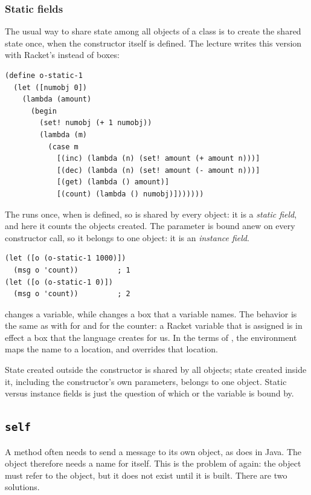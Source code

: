 \subsubsection{Static fields} The usual way to share state among all objects of a class is to create the shared state once, when the constructor itself is defined. The lecture writes this version with Racket's  instead of boxes:
\begin{lstlisting}
(define o-static-1
  (let ([numobj 0])
    (lambda (amount)
      (begin
        (set! numobj (+ 1 numobj))
        (lambda (m)
          (case m
            [(inc) (lambda (n) (set! amount (+ amount n)))]
            [(dec) (lambda (n) (set! amount (- amount n)))]
            [(get) (lambda () amount)]
            [(count) (lambda () numobj)]))))))
\end{lstlisting}
The  runs once, when  is defined, so  is shared by every object: it is a \emph{static field}, and here it counts the objects created. The parameter  is bound anew on every constructor call, so it belongs to one object: it is an \emph{instance field}.
\begin{lstlisting}[style=repl]
(let ([o (o-static-1 1000)])
  (msg o 'count))         ; 1
(let ([o (o-static-1 0)])
  (msg o 'count))         ; 2
\end{lstlisting}
 changes a variable, while  changes a box that a variable names. The behavior is the same as with  for  and  for the counter: a Racket variable that is assigned is in effect a box that the language creates for us. In the terms of , the environment maps the name to a location, and  overrides that location.

\begin{keypoint}[Lifetime of a binding = how widely it is shared]
State created outside the constructor is shared by all objects; state created inside it, including the constructor's own parameters, belongs to one object. Static versus instance fields is just the question of which  or  the variable is bound by.
\end{keypoint}

\subsection{\texttt{self}}

A method often needs to send a message to its own object, as  does in Java. The object therefore needs a name for itself. This is the problem of  again: the object must refer to the object, but it does not exist until it is built. There are two solutions.

